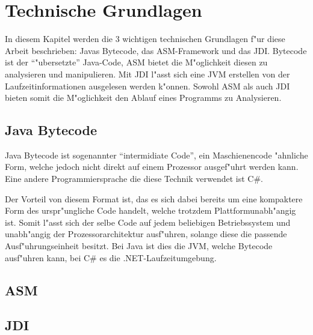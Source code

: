 
\chapter{Technische Grundlagen}

In diesem Kapitel werden die 3 wichtigen technischen Grundlagen f"ur diese Arbeit beschrieben: Javas Bytecode, das ASM-Framework und das \ac{JDI}. Bytecode ist der "`"ubersetzte"' Java-Code, ASM bietet die M"oglichkeit diesen zu analysieren und manipulieren. Mit \ac{JDI} l"asst sich eine \ac{JVM} erstellen von der Laufzeitinformationen ausgelesen werden k"onnen. Sowohl ASM als auch \ac{JDI} bieten somit die M"oglichkeit den Ablauf eines Programms zu Analysieren.

\section{Java Bytecode} 

Java Bytecode ist sogenannter "`intermidiate Code"', ein Maschienencode "ahnliche Form, welche jedoch nicht direkt auf einem Prozessor ausgef"uhrt werden kann. Eine andere Programmiersprache die diese Technik verwendet ist C\#.

Der Vorteil von diesem Format ist, das es sich dabei bereits um eine kompaktere Form des urspr"ungliche Code handelt, welche trotzdem Plattformunabh"angig ist. Somit l"asst sich der selbe Code auf jedem beliebigen Betriebssystem und unabh"angig der Prozessorarchitektur ausf"uhren, solange diese die passende Ausf"uhrungseinheit besitzt.
Bei Java ist dies die \ac{JVM}, welche Bytecode ausf"uhren kann, bei C\# es die .NET-Laufzeitumgebung. 

\section{ASM} 



\section{JDI} 

